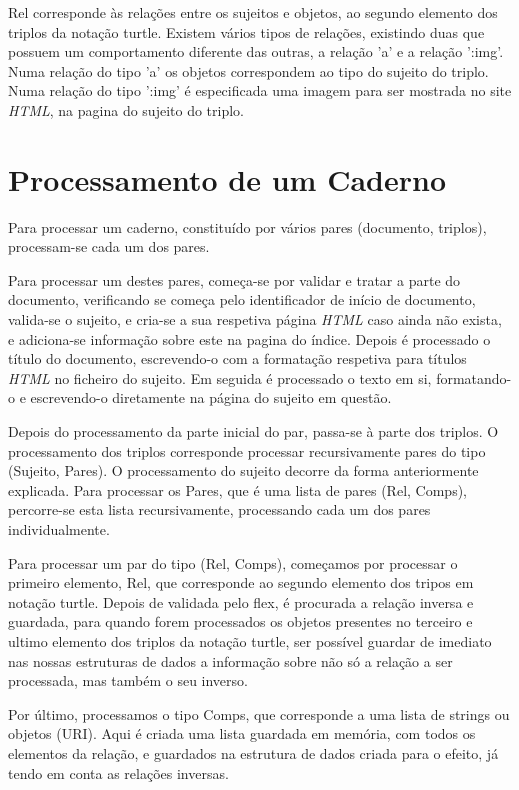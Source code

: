 \documentclass[a4paper]{report}
\begin{document}
Rel corresponde às relações entre os sujeitos e objetos, ao segundo elemento dos
triplos da notação turtle. Existem vários tipos de relações, existindo duas que
possuem um comportamento diferente das outras, a relação 'a' e a relação ':img'.
Numa relação do tipo 'a' os objetos correspondem ao tipo do sujeito do triplo.
Numa relação do tipo ':img' é especificada uma imagem para ser mostrada no site
\textit{HTML}, na pagina do sujeito do triplo.

\section{Processamento de um Caderno}

Para processar um caderno, constituído por vários pares (documento, triplos),
processam-se cada um dos pares.

Para processar um destes pares, começa-se por validar e tratar a parte do
documento, verificando se começa pelo identificador de início de documento,
valida-se o sujeito, e cria-se a sua respetiva página \textit{HTML} caso ainda
não exista, e adiciona-se informação sobre este na
pagina do índice. Depois é processado o título do documento, escrevendo-o com a
formatação respetiva para títulos \textit{HTML} no ficheiro do sujeito. Em
seguida é processado o texto em si, formatando-o e escrevendo-o diretamente na
página do sujeito em questão.

Depois do processamento da parte inicial do par, passa-se à parte dos triplos.
O processamento dos triplos corresponde processar recursivamente pares do tipo
(Sujeito, Pares). O processamento do sujeito decorre da forma anteriormente
explicada. Para processar os Pares, que é uma lista de pares (Rel, Comps),
percorre-se esta lista recursivamente, processando cada um dos pares
individualmente.

Para processar um par do tipo (Rel, Comps), começamos por processar o primeiro
elemento, Rel, que corresponde ao segundo elemento dos tripos em notação turtle.
Depois de validada pelo flex, é procurada a relação inversa e guardada, para
quando forem processados os objetos presentes no terceiro e ultimo elemento dos
triplos da notação turtle, ser possível guardar de imediato nas nossas 
estruturas de dados a informação sobre não só a relação a ser processada, mas
também o seu inverso.

Por último, processamos o tipo Comps, que corresponde a uma lista de strings ou
objetos (URI). Aqui é criada uma lista guardada em memória, com todos os
elementos da relação, e guardados na estrutura de dados criada para o efeito,
já tendo em conta as relações inversas.
\end{document}
